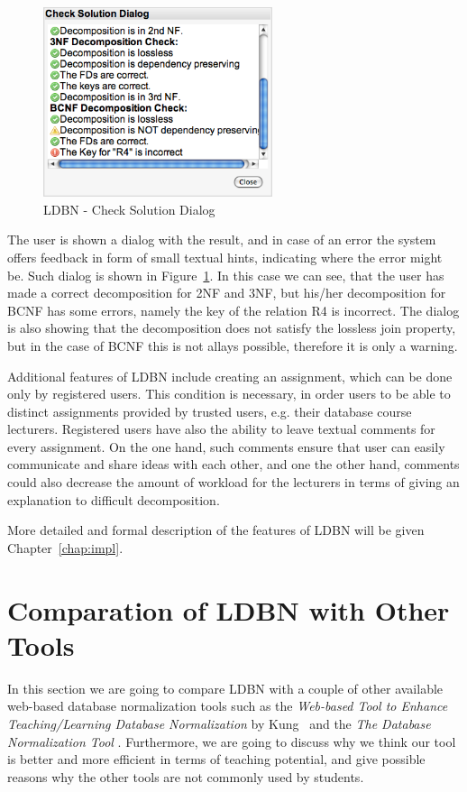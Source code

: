 \begin{figure}[h]
	\begin{center}
		\includegraphics[width=0.6\textwidth]{./img/screen03.png}
		\caption{LDBN - Check Solution Dialog}
		\label{fig:screen03}
	\end{center}
\end{figure}

The user is shown a dialog with the result, and in case of an error the system offers
feedback in form of small textual hints, indicating
where the error might be. Such dialog is shown in Figure~\ref{fig:screen03}. In this case
we can see, that the user has made a correct decomposition for 2NF and 3NF,
but his/her decomposition for BCNF has some errors, namely the key of the relation R4 is
incorrect. The dialog is also showing that the decomposition does not 
satisfy the lossless join property, but in the case of BCNF this
is not allays possible, therefore it is only a warning. 

Additional features of LDBN include creating an assignment, which can be done 
only by registered users. This condition is necessary, in order users to be able 
to distinct assignments provided by trusted users, e.g. their database course
lecturers. Registered users have also the ability to leave textual comments 
for every assignment. On the one hand, such
comments ensure that user can easily communicate and share ideas
with each other, and one the other hand, comments could also decrease the amount of workload
for the lecturers in terms of giving an explanation to difficult decomposition.

More detailed and formal description of the features of LDBN will be given 
Chapter~\ref{chap:impl}. 

\section{Comparation of LDBN with Other Tools}
\label{sec:comparation}
In this section we are going to compare LDBN with a couple of other 
available web-based database normalization tools 
such as the \textit{Web-based Tool to Enhance Teaching/Learning Database 
Normalization} by Kung~\cite{p8} and the \textit{The Database Normalization Tool}
\cite{w1}. Furthermore, we are going to discuss why we think our tool is better 
and more efficient
in terms of teaching potential, and give possible reasons why the 
other tools are not commonly used by students.

